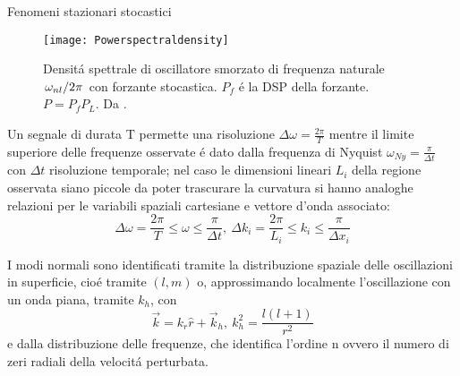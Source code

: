 \begin{comment}
\begin{align}
&\delta r|_{rms}=\exv{\vec{\xi}\cdot\hat{r}}=\frac{1}{2}|\tilde{xi}_r|^2\\
&=\frac{1}{\Pi}\int_0^{\pi}\,dt\frac{1}{4\pi}\oint\Re{\tilde{\xi}_rY_{l,m}(\theta,\phi)\exp{-i\omega t}}^2\,d\omega\\
&\delta h_{rms}^2=\exv{|\vec{\xi}_h|^2}=\frac{1}{2}l(l+1)|\tilde{\xi}_h(r)|^2\\
&\frac{\delta h|_{rms}}{\delta r|_{rms}}=\frac{\sqrt{l(l+1)}}{\sigma}
\end{align}
\end{comment}


\begin{frame}{Fenomeni stazionari stocastici}

\begin{figure}[!ht]
\centering
\texttt{[image: Powerspectraldensity]}
\caption{Densit\'a spettrale di oscillatore smorzato di frequenza naturale $\left.{\omega_{nl}}\middle/{2\pi}\right.$ con forzante stocastica. $P_f$ \'e la DSP della forzante. $P=P_fP_L$. Da \cite{houdek2006stochastic}.}\label{fig:Powerspectraldensity}
\end{figure}

Un segnale di durata T permette una risoluzione $\Delta\omega=\frac{2\pi}{T}$ mentre il limite superiore delle frequenze osservate \'e dato dalla frequenza di Nyquist $\omega_{Ny}=\frac{\pi}{\Delta t}$ con $\Delta t$ risoluzione temporale; nel caso le dimensioni lineari $L_i$ della regione osservata siano piccole da poter trascurare la curvatura si hanno analoghe relazioni per le variabili spaziali cartesiane e vettore d'onda associato:
\begin{equation}
\Delta\omega=\frac{2\pi}{T}\leq\omega\leq\frac{\pi}{\Delta t},\ \Delta k_i=\frac{2\pi}{L_i}\leq k_i\leq\frac{\pi}{\Delta x_i}
\end{equation}

I modi normali sono identificati tramite la distribuzione spaziale delle oscillazioni in superficie, cio\'e tramite $(l,m)$ o, approssimando localmente l'oscillazione con un onda piana, tramite $k_h$, con
\begin{equation}
\vec{k}=k_r\hat{r}+\vec{k}_h,\ k_h^2=\frac{l(l+1)}{r^2}
\end{equation}
e dalla distribuzione delle frequenze, che identifica l'ordine n ovvero il numero di zeri radiali della velocit\'a perturbata.


\end{frame}

